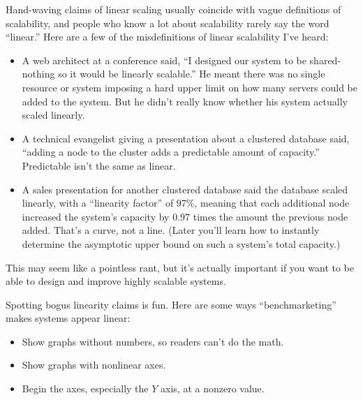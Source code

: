 \documentclass{vivid_layout}
\begin{document}
Hand-waving claims of linear scaling usually coincide with vague definitions
of scalability, and people who know a lot about scalability rarely say the word
``linear.'' Here are a few of the misdefinitions of linear scalability I've heard:

\begin{itemize}
\item A web architect at a conference said, ``I designed our system to be
shared-nothing so it would be linearly scalable.'' He meant there was no
single resource or system imposing a hard upper limit on how many servers could
be added to the system. But he didn't really know whether his system actually
scaled linearly.
\item A technical evangelist giving a presentation about a clustered database
said, ``adding a node to the cluster adds a predictable amount of capacity.''
Predictable isn't the same as linear.
\item A sales presentation for another clustered database said the database
scaled linearly, with a ``linearity factor'' of 97\%, meaning that each
additional node increased the system's capacity by 0.97 times the amount the
previous node added. That's a curve, not a line.  (Later you'll learn how to
instantly determine the asymptotic upper bound on such a system's total
capacity.)
\end{itemize}

This may seem like a pointless rant, but it's actually important if you want to
be able to design and improve highly scalable systems.

Spotting bogus linearity claims is fun. Here are some ways
``benchmarketing'' makes systems appear linear:

\begin{itemize}
\item Show graphs without numbers, so readers can't do the math.
\item Show graphs with nonlinear axes.
\item Begin the axes, especially the $Y$ axis, at a nonzero value.
\end{itemize}
\end{document}
